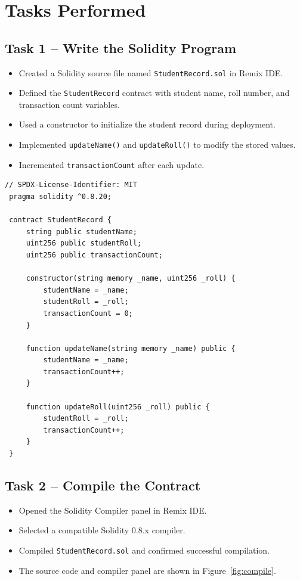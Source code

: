 \documentclass[12pt,a4paper]{article}
\begin{document}
\section{Tasks Performed}
\subsection{Task 1 -- Write the Solidity Program}
\begin{itemize}
    \item Created a Solidity source file named \texttt{StudentRecord.sol} in Remix IDE.
    \item Defined the \texttt{StudentRecord} contract with student name, roll number, and transaction count variables.
    \item Used a constructor to initialize the student record during deployment.
    \item Implemented \texttt{updateName()} and \texttt{updateRoll()} to modify the stored values.
    \item Incremented \texttt{transactionCount} after each update.
\end{itemize}

{\renewcommand{\baselinestretch}{0.9}\selectfont
\begin{lstlisting}[style=soliditystyle]
 // SPDX-License-Identifier: MIT
 pragma solidity ^0.8.20;

 contract StudentRecord {
     string public studentName;
     uint256 public studentRoll;
     uint256 public transactionCount;

     constructor(string memory _name, uint256 _roll) {
         studentName = _name;
         studentRoll = _roll;
         transactionCount = 0;
     }

     function updateName(string memory _name) public {
         studentName = _name;
         transactionCount++;
     }

     function updateRoll(uint256 _roll) public {
         studentRoll = _roll;
         transactionCount++;
     }
 }
\end{lstlisting}
}

\subsection{Task 2 -- Compile the Contract}
\begin{itemize}
    \item Opened the Solidity Compiler panel in Remix IDE.
    \item Selected a compatible Solidity 0.8.x compiler.
    \item Compiled \texttt{StudentRecord.sol} and confirmed successful compilation.
    \item The source code and compiler panel are shown in Figure~\ref{fig:compile}.
\end{itemize}
\end{document}
